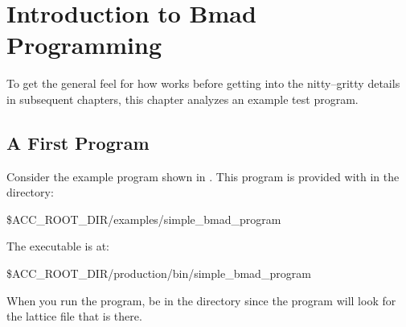 \chapter{Introduction to Bmad Programming}
\label{c:program.info}

To get the general feel for how \bmad works before
getting into the nitty--gritty details in subsequent chapters, this
chapter analyzes an example test program.

\section{A First Program}
\label{s:first.program}

Consider the example program shown in .  This program
is provided with \bmad in the directory:
\begin{example}
  \$ACC_ROOT_DIR/examples/simple_bmad_program
\end{example}
The executable is at:
\begin{example}
  \$ACC_ROOT_DIR/production/bin/simple_bmad_program
\end{example}
When you run the program, be in the  directory since
the program will look for the  lattice file that is there.

